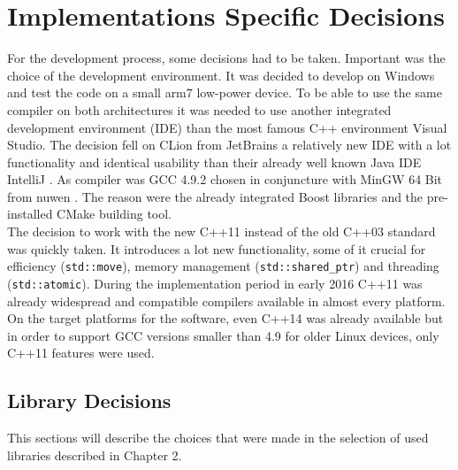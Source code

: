 \section{Implementations Specific Decisions}
For the development process, some decisions had to be taken. Important was the choice of the development environment. It was decided to develop on Windows and test the code on a small arm7 low-power device. To be able to use the same compiler on both architectures it was needed to use another integrated development environment (IDE) than the most famous C++ environment Visual Studio. The decision fell on CLion from JetBrains \cite{clion} a relatively new IDE with a lot functionality and identical usability than their already well known Java IDE IntelliJ \cite{intellij}. As compiler was GCC 4.9.2 chosen in conjuncture with MinGW 64 Bit from nuwen \cite{mingw}. The reason were the already integrated Boost libraries and the pre-installed CMake building tool.\\
The decision to work with the new C++11 \cite{cpp_11} instead of the old C++03 \cite{cpp_03} standard was quickly taken. It introduces a lot new functionality, some of it crucial for efficiency (\texttt{std::move}), memory management (\texttt{std::shared\_ptr}) and threading (\texttt{std::atomic}). During the implementation period in early 2016 C++11 was already widespread and compatible compilers available in almost every platform. On the target platforms for the software, even C++14 \cite{cpp_14} was already available but in order to support GCC versions smaller than 4.9 for older Linux devices, only C++11 features were used.
\subsection{Library Decisions}
This sections will describe the choices that were made in the selection of used libraries described in Chapter 2.


